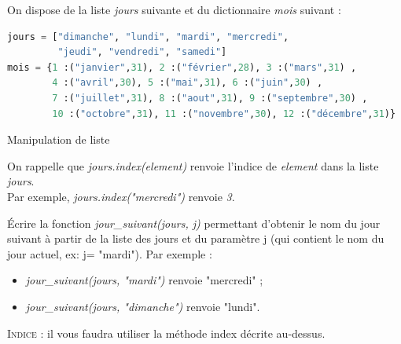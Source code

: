 \documentclass[a4paper, noanswers, addpoints, 12pt]{exam}
\begin{document}
On dispose de la liste \textit{jours} suivante et du dictionnaire \textit{mois} suivant :
\begin{lstlisting}[language=Python]
jours = ["dimanche", "lundi", "mardi", "mercredi",
         "jeudi", "vendredi", "samedi"]
mois = {1 :("janvier",31), 2 :("février",28), 3 :("mars",31) ,
        4 :("avril",30), 5 :("mai",31), 6 :("juin",30) ,
        7 :("juillet",31), 8 :("aout",31), 9 :("septembre",30) ,
        10 :("octobre",31), 11 :("novembre",30), 12 :("décembre",31)}
\end{lstlisting}

\vspace{0.5cm}

\begin{questions} 
\question[2] Manipulation de liste

\vspace{0.5cm}

On rappelle que \textit{jours.index(element)} renvoie l'indice de \textit{element} dans la liste \textit{jours}.\\
Par exemple, \textit{jours.index("mercredi")} renvoie \textit{3}.

\vspace{0.5cm}

\question[2]  Écrire la fonction \textit{jour\_suivant(jours, j)} permettant d'obtenir le nom du jour suivant à partir de la liste des jours et du paramètre j (qui contient le nom du jour actuel, ex: j= "mardi").
Par exemple :
\begin{itemize}
\item \textit{jour\_suivant(jours, "mardi")} renvoie "mercredi" ;
\item \textit{jour\_suivant(jours, "dimanche")} renvoie "lundi".
\end{itemize}
\textsc{Indice :} il vous faudra utiliser la méthode index décrite au-dessus.

\vspace{0.5cm}


\end{questions}
\end{document}
